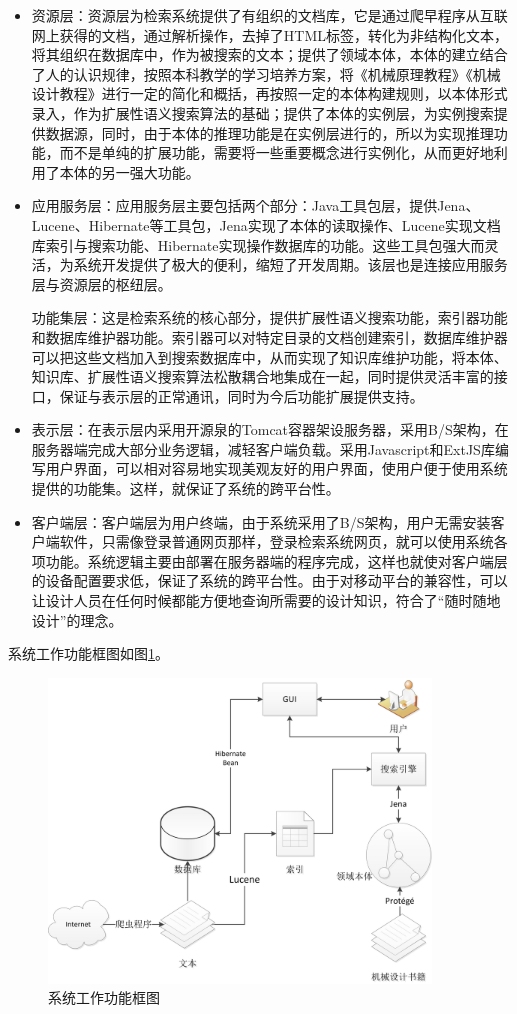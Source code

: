 \documentclass[12pt,a4paper]{article}
\begin{document}
	\begin{itemize}
	 	\item
	资源层：资源层为检索系统提供了有组织的文档库，它是通过爬早程序从互联网上获得的文档，通过解析操作，去掉了HTML标签，转化为非结构化文本，将其组织在数据库中，作为被搜索的文本；提供了领域本体，本体的建立结合了人的认识规律，按照本科教学的学习培养方案，将《机械原理教程》《机械设计教程》进行一定的简化和概括，再按照一定的本体构建规则，以本体形式录入，作为扩展性语义搜索算法的基础；提供了本体的实例层，为实例搜索提供数据源，同时，由于本体的推理功能是在实例层进行的，所以为实现推理功能，而不是单纯的扩展功能，需要将一些重要概念进行实例化，从而更好地利用了本体的另一强大功能。
		\item
	应用服务层：应用服务层主要包括两个部分：Java工具包层，提供Jena、Lucene、Hibernate等工具包，Jena实现了本体的读取操作、Lucene实现文档库索引与搜索功能、Hibernate实现操作数据库的功能。这些工具包强大而灵活，为系统开发提供了极大的便利，缩短了开发周期。该层也是连接应用服务层与资源层的枢纽层。
	
	功能集层：这是检索系统的核心部分，提供扩展性语义搜索功能，索引器功能和数据库维护器功能。索引器可以对特定目录的文档创建索引，数据库维护器可以把这些文档加入到搜索数据库中，从而实现了知识库维护功能，将本体、知识库、扩展性语义搜索算法松散耦合地集成在一起，同时提供灵活丰富的接口，保证与表示层的正常通讯，同时为今后功能扩展提供支持。
		\item
	表示层：在表示层内采用开源泉的Tomcat容器架设服务器，采用B/S架构，在服务器端完成大部分业务逻辑，减轻客户端负载。采用Javascript和ExtJS库编写用户界面，可以相对容易地实现美观友好的用户界面，使用户便于使用系统提供的功能集。这样，就保证了系统的跨平台性。
		\item
	客户端层：客户端层为用户终端，由于系统采用了B/S架构，用户无需安装客户端软件，只需像登录普通网页那样，登录检索系统网页，就可以使用系统各项功能。系统逻辑主要由部署在服务器端的程序完成，这样也就使对客户端层的设备配置要求低，保证了系统的跨平台性。由于对移动平台的兼容性，可以让设计人员在任何时候都能方便地查询所需要的设计知识，符合了“随时随地设计”的理念。
	
	\end{itemize}
	
	系统工作功能框图如图\ref{fig:功能框图}。
	
	\begin{figure}[htbp] 
	\centering\includegraphics[width=4in]{fig/功能框图.jpg} 
	\caption{系统工作功能框图}\label{fig:功能框图} 
	\end{figure} 
	
\end{document}
